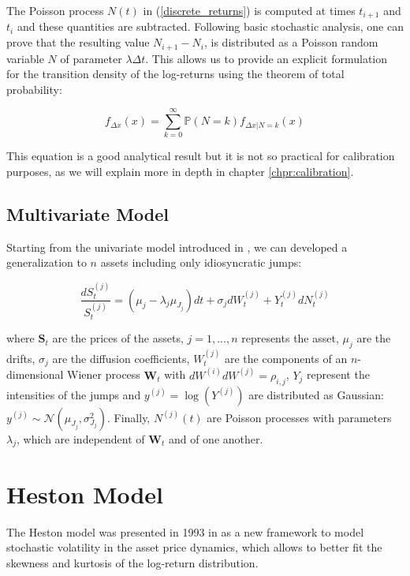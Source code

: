 The Poisson process $N(t)$ in (\ref{discrete_returns}) is computed at times $t_{i+1}$ and $t_i$ and these quantities are subtracted. Following basic stochastic analysis, one can prove that the resulting value $N_{i+1} - N_i$,  is distributed as a Poisson random variable $N$ of parameter $\lambda \Delta t$.
This allows us to provide an explicit formulation for the transition density of the log-returns using the theorem of total probability:

\begin{equation}
\label{transitional}
f_{\Delta x} (x) = \sum_{k=0}^{\infty} \mathbb{P}(N = k) f_{\Delta x | N = k}(x) 
\end{equation}

This equation is a good analytical result but it is not so practical for calibration purposes, as we will explain more in depth in chapter \ref{chpr:calibration}.


\subsection{Multivariate Model}
Starting from the univariate model introduced in \cite{MERTON1976}, we can developed a generalization to $n$ assets including only idiosyncratic jumps:

\begin{equation}
\frac{dS_t^{(j)}}{S_t^{(j)}} = (\mu_j - \lambda_j \mu_{J_j}) dt + \sigma_j dW_t^{(j)} + Y^{(j)}_t dN^{(j)}_t
\end{equation}

where $\mathbf{S}_t$ are the prices of the assets, $j = 1, ...  ,n$ represents the asset, $\mu_j$ are the drifts, $\sigma_j$ are the diffusion coefficients, $W^{(j)}_t$ are the components of an $n$-dimensional Wiener process $ \mathbf{W}_t$ with $dW^{(i)}dW^{(j)}=\rho_{i,j}$, $Y_j$ represent the intensities of the jumps and  $y^(j) = \log(Y^{(j)})$ are distributed as Gaussian: $y^(j)  \sim \mathcal{N}(\mu_{J_j} , \sigma_{J_j}^2)$. Finally, $N^{(j)}(t)$ are Poisson processes with parameters $\lambda_j$, which are independent of $\mathbf{W}_t$ and of one another. 

\bigskip

\section{Heston Model}

The Heston model was presented in 1993 in \cite{HESTON93} as a new framework to model stochastic volatility in the asset price dynamics, which allows to better fit the skewness and kurtosis of the log-return distribution.

